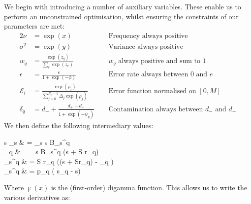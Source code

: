 \documentclass[fleqn,usenatbib]{mnras}
\newcommand{\pdiv}[2]{\frac{\partial #1}{\partial #2}}
\begin{document}
{{					We begin with introducing a number of auxiliary variables. These enable us to perform an unconstrained optimisation, whilst ensuring the constraints of our parameters are met:
					\begin{alignat}{2}
						\nu & = \exp(x) \quad && \text{Frequency always positive}
						\\
						\sigma^2 &= \exp(y) \quad && \text{Variance always positive}
						\\
						w_q & = \frac{\exp(z_q)}{\sum_r \exp(z_r)}\quad && \text{$w_q$ always positive and sum to 1}
						\\
						\epsilon & = \frac{e}{1+\exp(-\phi)} && \text{Error rate always between 0 and $e$}
						\\
						\mathcal{E}_i & = \frac{\exp{(\rho_i)}}{\sum_{j=0}^{R_\epsilon-1} \Delta_j \exp{(\rho_j)}} && \text{Error function normalised on $[0,M]$}
						\\
						\delta_q & = d_- + \frac{d_+ - d_-}{1 + \exp(-\psi_q)} ~~&& \text{Contamination always between $d_-$ and $d_+$}
					\end{alignat}
					We then define the following intermediary values:
					\begin{spalign}
						\langle s \rangle_s & = \sum_s s B_s^q
						\\
						\langle \digamma \rangle_q & = \sum_s B_s^q \digamma(s + S r_q)
						\\
						\tau_s^q & = S r_q \left(\digamma(s + Sr_q) - \langle \digamma_q \rangle \right)
						\\
						\lambda_s^q & = p_q \left( \langle s_q \rangle - s\right)
					\end{spalign}
					Where $\digamma(x)$ is the (first-order) digamma function. This allows us to write the various derivatives as:
					\begin{description}
							

\end{description}}}
\end{document}

